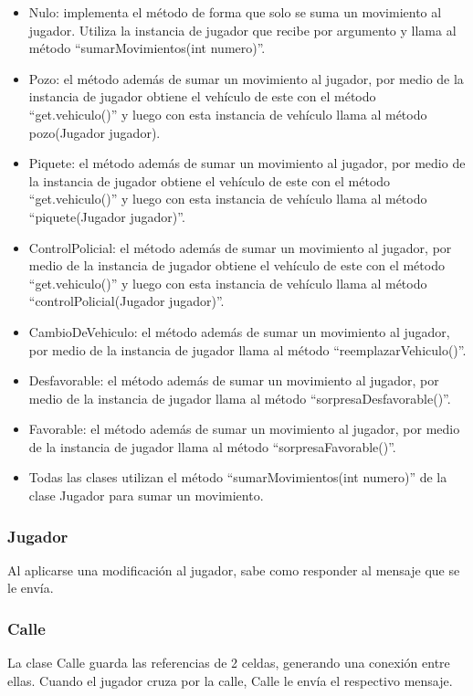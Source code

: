 \documentclass[titlepage,a4paper]{article}
\begin{document}
\begin{itemize}
  \item Nulo: implementa el método de forma que solo se suma un movimiento al jugador. Utiliza la instancia de jugador que recibe por argumento y llama al método “sumarMovimientos(int numero)”. 
  \item Pozo: el método además de sumar un movimiento al jugador, por medio de la instancia de jugador obtiene el vehículo de este con el método “get.vehiculo()” y luego con esta instancia de vehículo llama al método pozo(Jugador jugador). 
  \item Piquete: el método además de sumar un movimiento al jugador, por medio de la instancia de jugador obtiene el vehículo de este con el método “get.vehiculo()” y luego con esta instancia de vehículo llama al método “piquete(Jugador jugador)”. 
  \item ControlPolicial: el método además de sumar un movimiento al jugador, por medio de la instancia de jugador obtiene el vehículo de este con el método “get.vehiculo()” y luego con esta instancia de vehículo llama al método “controlPolicial(Jugador jugador)”. 
  \item CambioDeVehiculo: el método además de sumar un movimiento al jugador, por medio de la instancia de jugador llama al método “reemplazarVehiculo()”.
  \item Desfavorable: el método además de sumar un movimiento al jugador, por medio de la instancia de jugador llama al método “sorpresaDesfavorable()”.
  \item Favorable: el método además de sumar un movimiento al jugador, por medio de la instancia de jugador llama al método “sorpresaFavorable()”.
  \item Todas las clases utilizan el método “sumarMovimientos(int numero)” de la clase Jugador para sumar un movimiento. 
\end{itemize}

\subsubsection[Jugador]{Jugador}

Al aplicarse una modificación al jugador, sabe como responder al mensaje que se le envía.


\subsubsection[Calle]{Calle}

La clase Calle guarda las referencias de 2 celdas, generando una conexión entre ellas. Cuando el jugador cruza por la calle, Calle le envía el respectivo mensaje.
\end{document}

